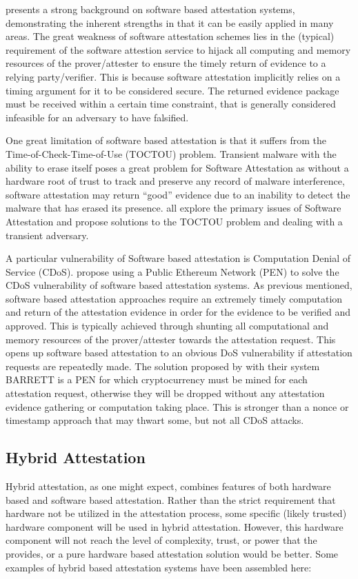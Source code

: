 \documentclass[acmsmall]{acmart}
\theoremstyle{definition}
\begin{document}
\citet{Armknecht:2013:Software-Attestation-Framework} presents a strong background on software based attestation systems, demonstrating the inherent strengths in that it can be easily applied in many areas. The great weakness of software attestation schemes lies in the (typical) requirement of the software attestion service to hijack all computing and memory resources of the prover/attester to ensure the timely return of evidence to a relying party/verifier. This is because software attestation implicitly relies on a timing argument for it to be considered secure.
The returned evidence package must be received within a certain time constraint, that is generally considered infeasible for an adversary to have falsified.

One great limitation of software based attestation is that it
suffers from the Time-of-Check-Time-of-Use (TOCTOU) problem. Transient malware with the ability to erase itself poses a great problem for Software Attestation as without a hardware root of trust to track and preserve any record of malware interference, software attestation may return ``good'' evidence due to an inability to detect the malware that has erased its presence. \citet{nunes2019vrased,Nunes:2021:TOCTOU-Remote-Attestation} all explore the primary issues of Software Attestation and propose solutions to the TOCTOU problem and
dealing with a transient adversary.

A particular vulnerability of Software based attestation is Computation Denial of Service (CDoS).
\citet{Bampatsikos:2019:BARRETT} propose using a Public Ethereum Network (PEN) to solve the CDoS vulnerability of software based attestation systems. As previous mentioned, software based attestation approaches require an extremely timely computation and return of the attestation evidence in order for the evidence to be verified and approved. This is typically achieved through shunting all computational and memory resources of the prover/attester towards the attestation request.
This opens up software based attestation to an obvious DoS vulnerability if attestation requests are repeatedly made.
The solution proposed by \citet{Bampatsikos:2019:BARRETT} with their system BARRETT is a PEN for which cryptocurrency must be mined for each attestation request, otherwise they will be dropped without any attestation evidence gathering or computation taking place.
This is stronger than a nonce or timestamp approach that may thwart some, but not all CDoS attacks.

\subsection{Hybrid Attestation}
Hybrid attestation, as one might expect, combines features of both hardware based and software based attestation.
Rather than the strict requirement that hardware not be utilized in the attestation process, some specific (likely trusted)
hardware component will be used in hybrid attestation.
However, this hardware component will not reach the level of complexity, trust, or power that the 
provides, or a pure hardware based attestation solution would be better.
Some examples of hybrid based attestation systems have been assembled here:
\end{document}
